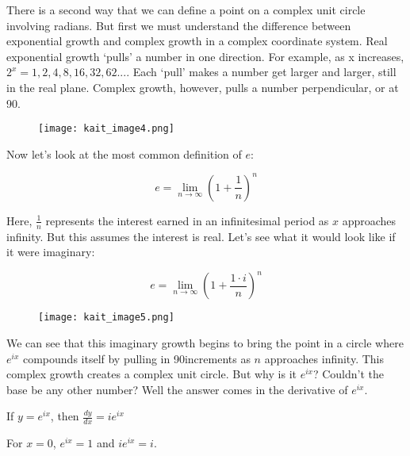 \documentclass{article}
\theoremstyle{definition}
\begin{document}
\noindent
There is a second way that we can define a point on a complex unit circle involving radians. But first we must understand the difference between exponential growth and complex growth in a complex coordinate system. Real exponential growth ‘pulls’ a number in one direction. For example, as x increases, $2^x=1,2,4,8,16,32,62...$. Each ‘pull’ makes a number get larger and larger, still in the real plane. Complex growth, however, pulls a number perpendicular, or at 90\degree. 


\begin{figure}[h!]
\begin{center}
\texttt{[image: kait\_image4.png]} 
\end{center}
\end{figure}


\noindent
Now let’s look at the most common definition of $e$:

\begin{center}
$$e=\lim_{n\to\infty} (1+\frac{1}{n})^n$$
\end{center}


\noindent
Here, $\frac{1}{n}$ represents the interest earned in an infinitesimal period as $x$ approaches infinity. But this assumes the interest is real. Let’s see what it would look like if it were imaginary:

\begin{center}
$$e=\lim_{n\to\infty} (1+\frac{1 \cdot i}{n})^n$$
\end{center}

\newpage
\begin{figure}[h!]
\begin{center}
\texttt{[image: kait\_image5.png]} 
\end{center}
\end{figure}


\noindent
We can see that this imaginary growth begins to bring the point in a circle where $e^{ix}$ compounds itself by pulling in 90\degree increments as $n$ approaches infinity. This complex growth creates a complex unit circle. But why is it $e^{ix}$? Couldn’t the base be any other number? Well the answer comes in the derivative of $e^{ix}$.

\begin{center}
If $y=e^{ix}$, then $\frac{dy}{dx}=ie^{ix}$

For $x=0$, $e^{ix}=1$ and $ie^{ix}=i$.
\end{center}
\end{document}
